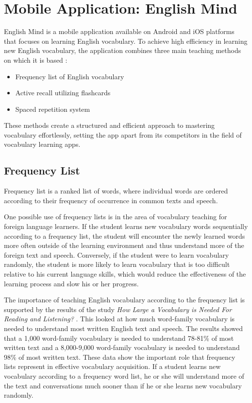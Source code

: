 \chapter{Mobile Application: English Mind}
\label{chap:mobile-application-english-mind}

English Mind is a mobile application available on Android \cite{cite:english_mind_play_store} and iOS \cite{cite:english_mind_app_store} platforms that focuses on learning English vocabulary. To achieve high efficiency in learning new English vocabulary, the application combines three main teaching methods on which it is based \cite{cite:english_mind_website}:

\begin{itemize}
    \item Frequency list of English vocabulary
    \item Active recall utilizing flashcards
    \item Spaced repetition system
\end{itemize}

These methods create a structured and efficient approach to mastering vocabulary effortlessly, setting the app apart from its competitors in the field of vocabulary learning apps.

\section{Frequency List}

Frequency list is a ranked list of words, where individual words are ordered according to their frequency of occurrence in common texts and speech. 

One possible use of frequency lists is in the area of vocabulary teaching for foreign language learners. If the student learns new vocabulary words sequentially according to a frequency list, the student will encounter the newly learned words more often outside of the learning environment and thus understand more of the foreign text and speech. Conversely, if the student were to learn vocabulary randomly, the student is more likely to learn vocabulary that is too difficult relative to his current language skills, which would reduce the effectiveness of the learning process and slow his or her progress.

The importance of teaching English vocabulary according to the frequency list is supported by the results of the study \textit{How Large a Vocabulary is Needed For Reading and Listening?} \cite{cite:nation2006_how_large_vocabulary_is_needed}. This looked at how much word-family vocabulary is needed to understand most written English text and speech. The results showed that a 1,000 word-family vocabulary is needed to understand 78-81\% of most written text and a 8,000-9,000 word-family vocabulary is needed to understand 98\% of most written text. These data show the important role that frequency lists represent in effective vocabulary acquisition. If a student learns new vocabulary according to a frequency word list, he or she will understand more of the text and conversations much sooner than if he or she learns new vocabulary randomly.

